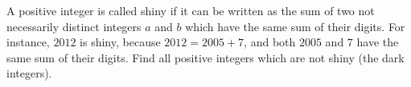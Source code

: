 A positive integer is called shiny if it can be written as the sum of two not necessarily distinct integers $a$ and $b$ which have the same sum of their digits. For instance, $2012$ is shiny, because $2012 = 2005 + 7$,  and both $2005$ and $7$ have the same sum of their digits. Find all positive integers which are not shiny (the dark integers).